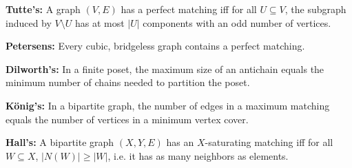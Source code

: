 	\textbf{Tutte's:} A graph $(V, E)$ has a perfect matching iff for all $U \subseteq V$, the subgraph induced by $V \setminus U$ has at most $|U|$ components with an odd number of vertices.

	\textbf{Petersens:} Every cubic, bridgeless graph contains a perfect matching.

	\textbf{Dilworth's:} In a finite poset, the maximum size of an antichain equals the minimum number of chains needed to partition the poset.

	\textbf{König's:} In a bipartite graph, the number of edges in a maximum matching equals the number of vertices in a minimum vertex cover.

	\textbf{Hall's:} A bipartite graph $(X, Y, E)$ has an $X$-saturating matching iff for all $W \subseteq X$, $|N(W)| \ge |W|$, i.e. it has as many neighbors as elements.
